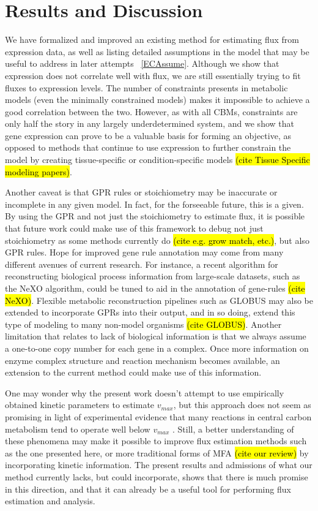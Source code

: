 \section{Results and Discussion}


We have formalized and improved an existing method for estimating flux
from expression data, as well as listing detailed assumptions in the
model that may be useful to address in later attempts ~\ref{ECAssume}.
Although we show that expression does not correlate well with flux, we
are still essentially trying to fit fluxes to expression levels.  The
number of constraints presents in metabolic models (even the minimally
constrained models) makes it impossible to achieve a good correlation
between the two. However, as with all CBMs, constraints are only half
the story in any largely underdetermined system, and we show that gene
expression can prove to be a valuable basis for forming an objective,
as opposed to methods that continue to use expression to further
constrain the model by creating tissue-specific or condition-specific
models \hl{(cite Tissue Specific modeling papers)}.


Another caveat is that GPR rules or stoichiometry may be inaccurate or
incomplete in any given model. In fact, for the forseeable future,
this is a given. By using the GPR and not just the stoichiometry to
estimate flux, it is possible that future work could make use of this
framework to debug not just stoichiometry as some methods currently do
\hl{(cite e.g. grow match, etc.)}, but also GPR rules.  Hope for
improved gene rule annotation may come from many different avenues of
current research. For instance, a recent algorithm for reconstructing
biological process information from large-scale datasets, such as the
NeXO algorithm, could be tuned to aid in the annotation of gene-rules
\hl{(cite NeXO)}. Flexible metabolic reconstruction pipelines such as
GLOBUS may also be extended to incorporate GPRs into their output, and
in so doing, extend this type of modeling to many non-model organisms
\hl{(cite GLOBUS)}.  Another limitation that relates to lack of
biological information is that we always assume a one-to-one copy
number for each gene in a complex. Once more information on enzyme
complex structure and reaction mechanism becomes available, an
extension to the current method could make use of this information.


One may wonder why the present work doesn't attempt to use empirically
obtained kinetic parameters to estimate $v_{max}$, but this approach
does not seem as promising in light of experimental evidence that many
reactions in central carbon metabolism tend to operate well below
$v_{max}$ \cite{Bennett2010}. Still, a better understanding of these
phenomena may make it possible to improve flux estimation methods such
as the one presented here, or more traditional forms of MFA \hl{(cite
  our review)} by incorporating kinetic information.  The present
results and admissions of what our method currently lacks, but could
incorporate, shows that there is much promise in this direction, and
that it can already be a useful tool for performing flux estimation
and analysis.


